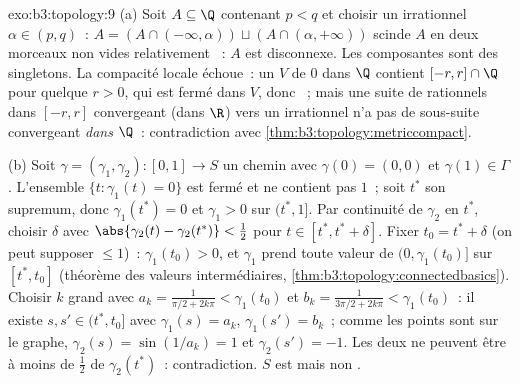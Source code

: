\begin{solution}{exo:b3:topology:9}
(a) Soit $A \subseteq \Q$ contenant $p < q$ et choisir un
irrationnel $\alpha \in (p, q)$~: $A = (A \cap (-\infty,
\alpha)) \sqcup (A\cap(\alpha, +\infty))$ scinde $A$ en deux
morceaux non vides relativement ~: $A$ est disconnexe.
Les composantes sont des singletons. La compacité locale
échoue~: un   $V$ de $0$ dans $\Q$ contient
$[-r, r]\cap\Q$ pour quelque $r > 0$, qui est fermé dans $V$,
donc ~; mais une suite de rationnels dans $[-r,r]$
convergeant (dans $\R$) vers un irrationnel n'a pas de
sous-suite convergeant \emph{dans $\Q$}~: contradiction avec
\cref{thm:b3:topology:metriccompact}.

(b) Soit $\gamma = (\gamma_1, \gamma_2) \colon [0,1] \to S$ un
chemin avec $\gamma(0) = (0,0)$ et $\gamma(1) \in \Gamma$.
L'ensemble $\{t : \gamma_1(t) = 0\}$ est fermé et ne contient
pas $1$~; soit $t^*$ son supremum, donc $\gamma_1(t^*) = 0$ et
$\gamma_1 > 0$ sur $(t^*, 1]$. Par continuité de $\gamma_2$ en
$t^*$, choisir $\delta$ avec $\abs{\gamma_2(t) -
\gamma_2(t^*)} < \tfrac12$ pour $t \in [t^*, t^* + \delta]$.
Fixer $t_0 = t^* + \delta$ (on peut supposer $\leq 1$)~:
$\gamma_1(t_0) > 0$, et $\gamma_1$ prend toute valeur de $(0,
\gamma_1(t_0)]$ sur $[t^*, t_0]$ (théorème des valeurs
intermédiaires, \cref{thm:b3:topology:connectedbasics}).
Choisir $k$ grand avec $a_k = \frac1{\pi/2 + 2k\pi} <
\gamma_1(t_0)$ et $b_k = \frac1{3\pi/2 + 2k\pi} <
\gamma_1(t_0)$~: il existe $s, s' \in (t^*, t_0]$ avec
$\gamma_1(s) = a_k$, $\gamma_1(s') = b_k$~; comme les points
sont sur le graphe, $\gamma_2(s) = \sin(1/a_k) = 1$ et
$\gamma_2(s') = -1$. Les deux ne peuvent être à moins de
$\frac12$ de $\gamma_2(t^*)$~: contradiction. $S$ est 
mais non .
\end{solution}


